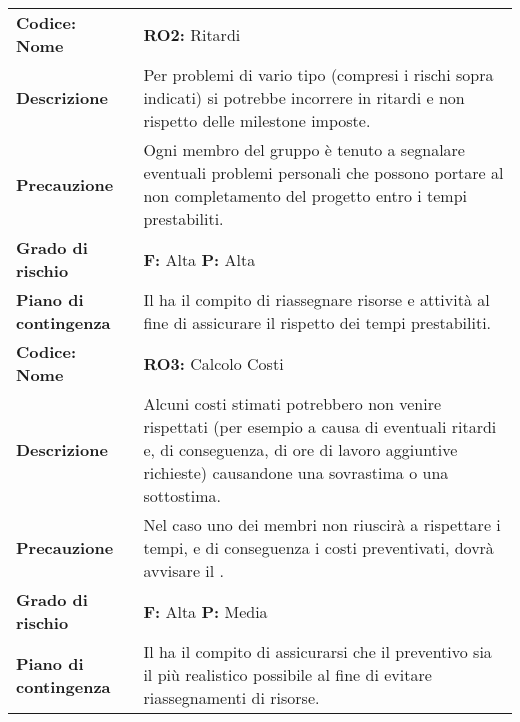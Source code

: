 {\begin{longtable}{C{3.5cm} | C{11cm}}
\textbf{Codice: Nome} & \textbf{RO2: }{Ritardi}\\
\textbf{Descrizione} & Per problemi di vario tipo (compresi i rischi sopra indicati) si potrebbe incorrere in ritardi e non rispetto delle milestone imposte.\\ 
\textbf{Precauzione} & Ogni membro del gruppo è tenuto a segnalare eventuali problemi personali che possono portare al non completamento del progetto entro i tempi prestabiliti.\\
\textbf{Grado di rischio} & \textbf{F: }Alta {\textbf{P: }}Alta\\
\textbf{Piano di contingenza} & Il \respProg{} ha il compito di riassegnare risorse e attività al fine di assicurare il rispetto dei tempi prestabiliti.\\
\hline

\textbf{Codice: Nome} & \textbf{RO3: }{Calcolo Costi}\\
\textbf{Descrizione} & Alcuni costi stimati potrebbero non venire rispettati (per esempio a causa di eventuali ritardi e, di conseguenza, di ore di lavoro aggiuntive richieste) causandone una sovrastima o una sottostima.\\
\textbf{Precauzione} & Nel caso uno dei membri non riuscirà a rispettare i tempi, e di conseguenza i costi preventivati, dovrà avvisare il \respProg{}.\\
\textbf{Grado di rischio} & \textbf{F: }Alta \textbf{P: }Media\\
\textbf{Piano di contingenza} & Il \respProg{} ha il compito di assicurarsi che il preventivo sia il più realistico possibile al fine di evitare riassegnamenti di risorse.\\
\hline
\end{longtable}
}

